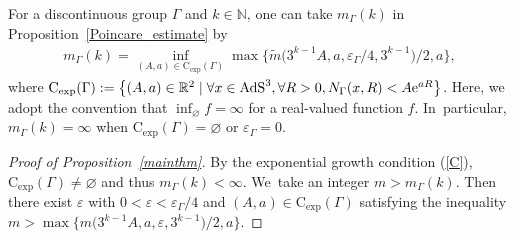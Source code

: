 \documentclass[pdftex]{sigma}
\numberwithin{equation}{section}
\begin{document}
For a discontinuous group $\Gamma$ and $k\in \mathbb{N}$,
one can take $m_{\Gamma}(k)$ in Proposition~\ref{Poincare_estimate} by
\begin{gather}
\label{Poincare_estimate}
m_{\Gamma}(k)=\inf_{(A,a)\in \mathrm{C_{exp}}(\Gamma)}
\max\big\{\tilde{m}\big(3^{k-1}A,a,\varepsilon_{\Gamma}/4,3^{k-1}\big)/2,a\big\},
\end{gather}
where $\mathrm{C_{exp}}(\Gamma):=\big\{(A,a)\in \mathbb{R}^{2} \mid
\forall x\in \mathrm{AdS}^{3},\forall R>0, N_{\Gamma}(x,R) < A{\rm e}^{aR}\big\}$.
Here,
we adopt the convention that $\inf_{\varnothing} f =\infty$ for a real-valued function $f$. In~particular,
$m_{\Gamma}(k)=\infty$ when $\mathrm{C_{exp}}(\Gamma)=\varnothing$
or $\varepsilon_{\Gamma}=0$.
\begin{proof}[Proof of Proposition~\ref{mainthm}]
By the exponential growth condition (\ref{C}), $\mathrm{C_{exp}}(\Gamma)\neq\varnothing$
and thus $m_{\Gamma}(k)<\infty$. We~take an integer $m >m_{\Gamma}(k)$.
Then there exist $\varepsilon$ with $0<\varepsilon<\varepsilon_{\Gamma}/4$
and $(A,a)\in\mathrm{C_{exp}}(\Gamma)$
satisfying the inequality
$m > \max\big\{m\big(3^{k-1}A,a,\varepsilon,3^{k-1}\big)/2,a\big\}$.


\end{proof}
\end{document}
